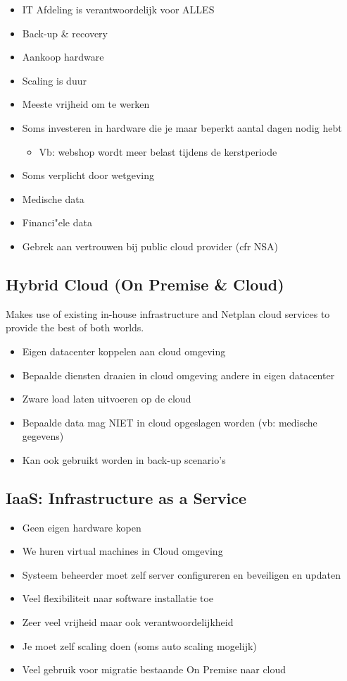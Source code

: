 \documentclass{article}
\begin{document}
\begin{itemize}
    \item IT Afdeling is verantwoordelijk voor ALLES
    \item Back-up \& recovery
    \item Aankoop hardware
    \item Scaling is duur
    \item Meeste vrijheid om te werken
    \item Soms investeren in hardware die je maar beperkt aantal dagen nodig hebt
    \begin{itemize}
        \item Vb: webshop wordt meer belast tijdens de kerstperiode
    \end{itemize}
    \item Soms verplicht door wetgeving
    \item Medische data
    \item Financi"ele data
    \item Gebrek aan vertrouwen bij public cloud provider (cfr NSA)
\end{itemize}

\subsection{Hybrid Cloud (On Premise \& Cloud)}
Makes use of existing in-house infrastructure and Netplan cloud services to provide the best of both worlds.

\begin{itemize}
    \item Eigen datacenter koppelen aan cloud omgeving
    \item Bepaalde diensten draaien in cloud omgeving andere in eigen datacenter
    \item Zware load laten uitvoeren op de cloud
    \item Bepaalde data mag NIET in cloud opgeslagen worden (vb: medische gegevens)
    \item Kan ook gebruikt worden in back-up scenario’s
\end{itemize}

\subsection{IaaS: Infrastructure as a Service}

\begin{itemize}
    \item Geen eigen hardware kopen
    \item We huren virtual machines in Cloud omgeving
    \item Systeem beheerder moet zelf server configureren en beveiligen en updaten
    \item Veel flexibiliteit naar software installatie toe
    \item Zeer veel vrijheid maar ook verantwoordelijkheid
    \item Je moet zelf scaling doen (soms auto scaling mogelijk)
    \item Veel gebruik voor migratie bestaande On Premise naar cloud
\end{itemize}
\end{document}
